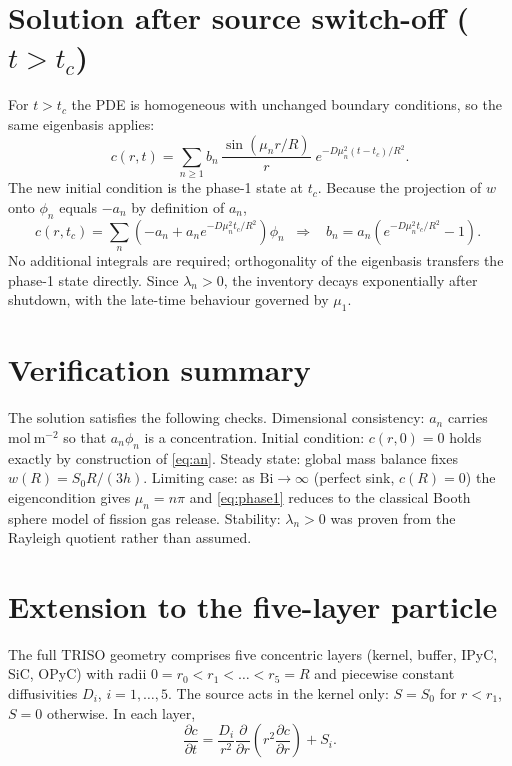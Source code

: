 \documentclass[11pt,a4paper]{article}
\newcommand{\Bi}{\mathrm{Bi}}
\begin{document}
\section{Solution after source switch-off ($t > t_c$)}

For $t > t_c$ the PDE is homogeneous with unchanged boundary conditions, so the same
eigenbasis applies:
\begin{equation}
c(r,t) = \sum_{n\ge 1} b_n\,\frac{\sin(\mu_n r/R)}{r}\;
e^{-D\mu_n^2 (t-t_c)/R^2}.
\end{equation}
The new initial condition is the phase-1 state at $t_c$. Because the projection of $w$
onto $\phi_n$ equals $-a_n$ by definition of $a_n$,
\begin{equation}
c(r,t_c) = \sum_n \left(-a_n + a_n e^{-D\mu_n^2 t_c/R^2}\right)\phi_n
\;\;\Longrightarrow\;\;
\boxed{\;b_n = a_n\left(e^{-D\mu_n^2 t_c/R^2} - 1\right).\;}
\label{eq:bn}
\end{equation}
No additional integrals are required; orthogonality of the eigenbasis transfers the
phase-1 state directly. Since $\lambda_n > 0$, the inventory decays exponentially after
shutdown, with the late-time behaviour governed by $\mu_1$.

\section{Verification summary}

The solution satisfies the following checks. Dimensional consistency: $a_n$ carries
$\mathrm{mol\ m^{-2}}$ so that $a_n\phi_n$ is a concentration. Initial condition:
$c(r,0)=0$ holds exactly by construction of \eqref{eq:an}. Steady state: global mass
balance fixes $w(R) = S_0R/(3h)$. Limiting case: as $\Bi\to\infty$ (perfect sink,
$c(R)=0$) the eigencondition gives $\mu_n = n\pi$ and \eqref{eq:phase1} reduces to the
classical Booth sphere model of fission gas release. Stability: $\lambda_n>0$ was proven
from the Rayleigh quotient rather than assumed.

\section{Extension to the five-layer particle}

The full TRISO geometry comprises five concentric layers (kernel, buffer, IPyC, SiC,
OPyC) with radii $0 = r_0 < r_1 < \dots < r_5 = R$ and piecewise constant diffusivities
$D_i$, $i = 1,\dots,5$. The source acts in the kernel only: $S = S_0$ for
$r < r_1$, $S = 0$ otherwise. In each layer,
\begin{equation}
\frac{\partial c}{\partial t}
= \frac{D_i}{r^2}\frac{\partial}{\partial r}\!\left(r^2\frac{\partial c}{\partial r}\right)
+ S_i .
\end{equation}
\end{document}
